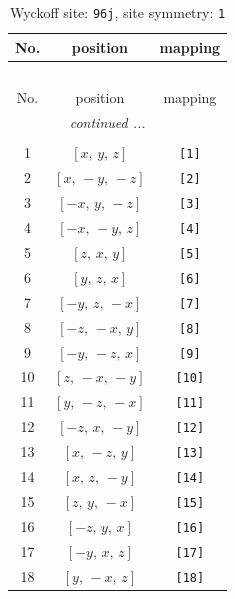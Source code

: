 \documentclass[fleqn,8pt]{jsarticle}
\begin{document}
\begin{longtable}{ccc}
\caption{Wyckoff site: {\tt 96j}, site symmetry: {\tt 1}}
 \\
 \hline \hline
No. & position & mapping \\ \hline \endfirsthead

\multicolumn{2}{l}{\tablename\ \thetable{}} \\
 \hline \hline
No. & position & mapping \\ \hline \endhead

 \hline \hline
\multicolumn{2}{r}{\footnotesize\it continued ...} \\ \endfoot

 \hline \hline
\multicolumn{2}{r}{} \\ \endlastfoot

1 & $\left[ x,\, y,\, z \right]$ & {\tt [1]} \\ \hline
2 & $\left[ x,\, - y,\, - z \right]$ & {\tt [2]} \\ \hline
3 & $\left[ - x,\, y,\, - z \right]$ & {\tt [3]} \\ \hline
4 & $\left[ - x,\, - y,\, z \right]$ & {\tt [4]} \\ \hline
5 & $\left[ z,\, x,\, y \right]$ & {\tt [5]} \\ \hline
6 & $\left[ y,\, z,\, x \right]$ & {\tt [6]} \\ \hline
7 & $\left[ - y,\, z,\, - x \right]$ & {\tt [7]} \\ \hline
8 & $\left[ - z,\, - x,\, y \right]$ & {\tt [8]} \\ \hline
9 & $\left[ - y,\, - z,\, x \right]$ & {\tt [9]} \\ \hline
10 & $\left[ z,\, - x,\, - y \right]$ & {\tt [10]} \\ \hline
11 & $\left[ y,\, - z,\, - x \right]$ & {\tt [11]} \\ \hline
12 & $\left[ - z,\, x,\, - y \right]$ & {\tt [12]} \\ \hline
13 & $\left[ x,\, - z,\, y \right]$ & {\tt [13]} \\ \hline
14 & $\left[ x,\, z,\, - y \right]$ & {\tt [14]} \\ \hline
15 & $\left[ z,\, y,\, - x \right]$ & {\tt [15]} \\ \hline
16 & $\left[ - z,\, y,\, x \right]$ & {\tt [16]} \\ \hline
17 & $\left[ - y,\, x,\, z \right]$ & {\tt [17]} \\ \hline
18 & $\left[ y,\, - x,\, z \right]$ & {\tt [18]} \\ \hline

\end{longtable}
\end{document}

